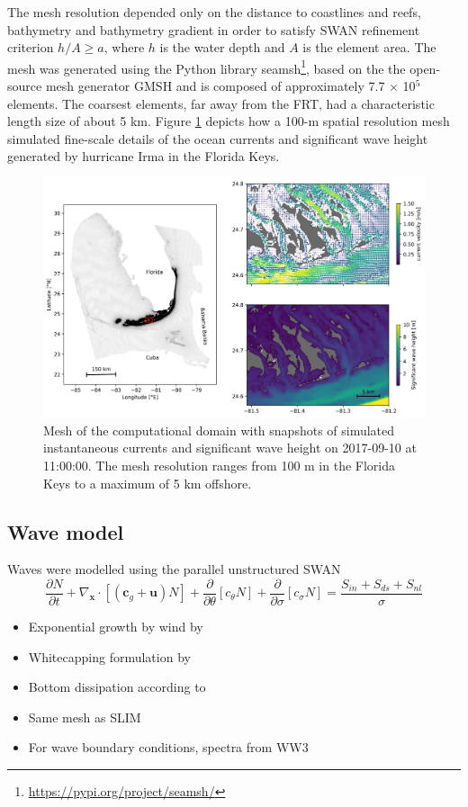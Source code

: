 \documentclass[11pt,a4paper]{article}
\begin{document}
The mesh resolution depended only on the distance to coastlines and reefs, bathymetry and bathymetry gradient in order to satisfy SWAN refinement criterion $h/A\geq a$, where $h$ is the water depth and $A$ is the element area. The mesh was generated using the Python library seamsh\footnote{\url{https://pypi.org/project/seamsh/}}, based on the the open-source mesh generator GMSH \citep{geuzaine2009gmsh} and is composed of approximately 7.7 $\times$ 10$^5$ elements. The coarsest elements, far away from the FRT, had a characteristic length size of about 5 km. Figure \ref{fig:mesh} depicts how a 100-m spatial resolution mesh simulated fine-scale details of the ocean currents and significant wave height generated by hurricane Irma in the Florida Keys.

\begin{figure}
    \centering
    \includegraphics[width=.95\textwidth]{fig/fig_mesh_ww3.png}
    \caption{Mesh of the computational domain with snapshots of simulated instantaneous currents and significant wave height on 2017-09-10 at 11:00:00. The mesh resolution ranges from 100 m in the Florida Keys to a maximum of 5 km offshore.}
    \label{fig:mesh}
\end{figure}
\subsection{Wave model}
Waves were modelled using the parallel unstructured SWAN \citep{booij1999third}
\begin{equation}
    \dfrac{\partial N}{\partial t} + \nabla_\mathbf{x}\cdot[(\mathbf{c}_g+\mathbf{u})N] + \dfrac{\partial }{\partial \theta}[c_\theta N] + \dfrac{\partial}{\partial \sigma}[c_\sigma N] = \dfrac{S_{in}+S_{ds}+S_{nl}}{\sigma}
\end{equation}
\begin{itemize}
    \item Exponential growth by wind by \cite{janssen1991quasi}
    \item Whitecapping formulation by \cite{komen1984existence}
    \item Bottom dissipation according to \cite{madsen1989spectral}
    \item Same mesh as SLIM
    \item For wave boundary conditions, spectra from WW3 \citep{tolman2009user}
\end{itemize}
\end{document}
